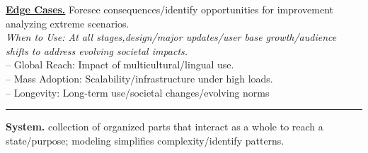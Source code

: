 \documentclass[8pt, a4paper]{extarticle}
\makeatletter
\renewcommand{\hline}{\noalign{\vskip 2px}\hrule\@height\arrayrulewidth\@width\linewidth\noalign{\vskip 2px}}
\makeatother
\begin{document}
\begin{minipage}[t]{0.48\textwidth}
{\begin{minipage}[t]{1\textwidth}
\begin{minipage}[t]{0.49\textwidth}
			\end{minipage}
			\begin{minipage}[t]{0.49\textwidth}
				\ul{\textbf{Edge Cases.}} Foresee consequences/identify opportunities for improvement analyzing extreme scenarios.\\
				\textit{When to Use: At all stages,design/major updates/user base growth/audience shifts to address evolving societal impacts.}\\
				– Global Reach: Impact of multicultural/lingual use.\\
				– Mass Adoption: Scalability/infrastructure under high loads.\\
				– Longevity: Long-term use/societal changes/evolving norms
				\hline
				\textbf{System.} collection of organized parts that interact as a whole to reach a state/purpose; modeling simplifies complexity/identify patterns.
			\end{minipage}
		\end{minipage}}\end{minipage}\hspace{8px}
\end{document}
